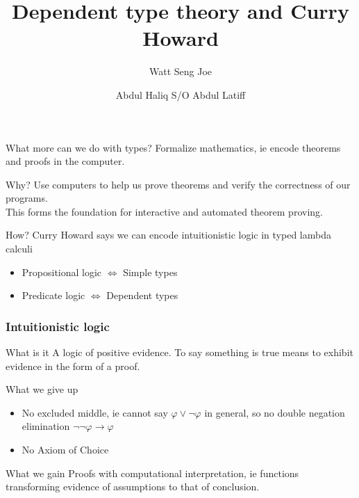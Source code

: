 \documentclass{beamer}
\title[Dependent type theory and Curry Howard]{Dependent type theory and Curry Howard}
\author{Watt Seng Joe \and Abdul Haliq S/O Abdul Latiff}
\begin{document}
\frame{\titlepage}

\begin{frame}
  \begin{block} {What more can we do with types?}
    Formalize mathematics, ie encode theorems and proofs in the computer.
  \end{block}

  \begin{block} {Why?}
    Use computers to help us prove theorems and verify the
    correctness of our programs. \\
    This forms the foundation for interactive and automated theorem proving.
  \end{block}

  \begin{block} {How?}
    Curry Howard says we can encode intuitionistic logic in typed lambda calculi
    \begin{itemize} [label=$\ast$]
      \item Propositional logic $\Longleftrightarrow$ Simple types
      \item Predicate logic $\Longleftrightarrow$ Dependent types
    \end{itemize}
  \end{block}
\end{frame}

\begin{frame}
  \frametitle{Intuitionistic logic}
   \begin{block} {What is it}
      A logic of positive evidence. To say something is true means to
      exhibit evidence in the form of a proof.
    \end{block}

    \begin{block} {What we give up}
      \begin{itemize} [label=$\ast$]
        \item No excluded middle, ie cannot say $\varphi \vee \neg \varphi$ in general, so
          no double negation elimination $\neg \neg \varphi \rightarrow \varphi$

        \item No Axiom of Choice
       \end{itemize}
    \end{block}

     \begin{block} {What we gain}
        Proofs with computational interpretation, ie functions transforming
        evidence of assumptions to that of conclusion.
    \end{block}

\end{frame}
\end{document}
